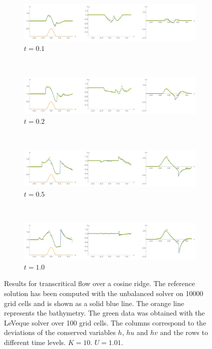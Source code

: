\begin{figure}
  \centering
  \begin{subfigure}{\textwidth}
    \includegraphics[width=\textwidth]{diagrams/results-flow-1}
    \caption{$t = 0.1$}
    \label{fig:results-flow-1}
  \end{subfigure} \\
  \begin{subfigure}{\textwidth}
    \includegraphics[width=\textwidth]{diagrams/results-flow-2}
    \caption{$t = 0.2$}
    \label{fig:results-flow-2}
  \end{subfigure} \\
  \begin{subfigure}{\textwidth}
    \includegraphics[width=\textwidth]{diagrams/results-flow-5}
    \caption{$t = 0.5$}
    \label{fig:results-flow-5}
  \end{subfigure} \\
  \begin{subfigure}{\textwidth}
    \includegraphics[width=\textwidth]{diagrams/results-flow-10}
    \caption{$t = 1.0$}
    \label{fig:results-flow-10}
  \end{subfigure}
  \caption{Results for transcritical flow over a cosine ridge. The reference solution has been computed with the unbalanced solver on 10000 grid cells and is shown as a solid blue line. The orange line represents the bathymetry. The green data was obtained with the LeVeque solver over 100 grid cells. The columns correspond to the deviations of the conserved variables $h$, $hu$ and $hv$ and the rows to different time levels. $K = 10$. $U = 1.01$.}
  \label{fig:results-flow}
\end{figure}

